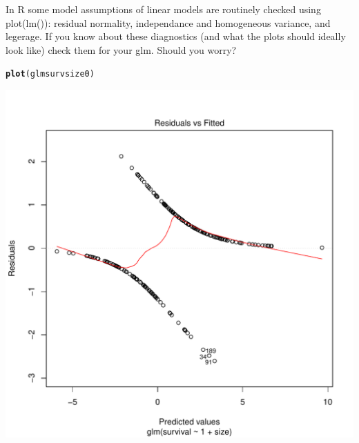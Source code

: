 \documentclass[12pt,a4paper]{scrartcl}\usepackage[]{graphicx}\usepackage[]{color}
\makeatletter
\def\maxwidth{ %
  \ifdim\Gin@nat@width>\linewidth
    \linewidth
  \else
    \Gin@nat@width
  \fi
}
\newcommand{\hlstd}[1]{\textcolor[rgb]{0.345,0.345,0.345}{#1}}%
\newcommand{\hlkwd}[1]{\textcolor[rgb]{0.737,0.353,0.396}{\textbf{#1}}}%
\newenvironment{kframe}{%
 \def\at@end@of@kframe{}%
 \ifinner\ifhmode%
  \def\at@end@of@kframe{\end{minipage}}%
  \begin{minipage}{\columnwidth}%
 \fi\fi%
 \def\FrameCommand##1{\hskip\@totalleftmargin \hskip-\fboxsep
 \colorbox{shadecolor}{##1}\hskip-\fboxsep
     \hskip-\linewidth \hskip-\@totalleftmargin \hskip\columnwidth}%
 \MakeFramed {\advance\hsize-\width
   \@totalleftmargin\z@ \linewidth\hsize
   \@setminipage}}%
 {\par\unskip\endMakeFramed%
 \at@end@of@kframe}
\newenvironment{knitrout}{}{} %
\makeatother
\begin{document}
\begin{Exercise}[difficulty=1, title={Model assumptions}]
In R some model assumptions of linear models are routinely checked using plot(lm()): residual normality, independance and homogeneous variance, and legerage. If you know about these diagnostics (and what the plots should ideally look like) check them for your glm. Should you worry?
\end{Exercise}
\begin{Answer}
\begin{knitrout}
\color{fgcolor}\begin{kframe}
\begin{alltt}
\hlkwd{plot}\hlstd{(glmsurvsize0)}
\end{alltt}
\end{kframe}
\includegraphics[width=\maxwidth]{figure/unnamed-chunk-3-1} 


\end{knitrout}
\end{Answer}
\end{document}
